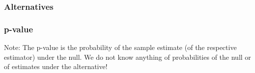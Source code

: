 \documentclass[xcolor={table}]{beamer}
\begin{document}
\begin{frame}\frametitle{Alternatives}
\end{frame}


\begin{frame}\frametitle{p-value}
  \begin{alertblock}{Note:}
    The p-value is the probability of the sample estimate (of the respective estimator) under the null. We do not know anything of probabilities of the null or of estimates under the alternative!
  \end{alertblock}
\end{frame}
\end{document}
